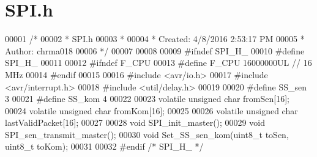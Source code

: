 \hypertarget{styr_2styr_2_s_p_i_8h_source}{}\section{S\+P\+I.\+h}
\label{styr_2styr_2_s_p_i_8h_source}

\begin{DoxyCode}
00001 \textcolor{comment}{/*}
00002 \textcolor{comment}{ * SPI.h}
00003 \textcolor{comment}{ *}
00004 \textcolor{comment}{ * Created: 4/8/2016 2:53:17 PM}
00005 \textcolor{comment}{ *  Author: chrma018}
00006 \textcolor{comment}{ */} 
00007 
00008 
00009 \textcolor{preprocessor}{#ifndef SPI\_H\_}
00010 \textcolor{preprocessor}{#define SPI\_H\_}
00011 
00012 \textcolor{preprocessor}{#ifndef F\_CPU}
00013 \textcolor{preprocessor}{#define F\_CPU 16000000UL        // 16 MHz}
00014 \textcolor{preprocessor}{#endif}
00015 
00016 \textcolor{preprocessor}{#include <avr/io.h>}
00017 \textcolor{preprocessor}{#include <avr/interrupt.h>}
00018 \textcolor{preprocessor}{#include <util/delay.h>}
00019 
00020 \textcolor{preprocessor}{#define SS\_sen 3}
00021 \textcolor{preprocessor}{#define SS\_kom 4}
00022 
00023 \textcolor{keyword}{volatile} \textcolor{keywordtype}{unsigned} \textcolor{keywordtype}{char} fromSen[16];
00024 \textcolor{keyword}{volatile} \textcolor{keywordtype}{unsigned} \textcolor{keywordtype}{char} fromKom[16];
00025 
00026 \textcolor{keyword}{volatile} \textcolor{keywordtype}{unsigned} \textcolor{keywordtype}{char} lastValidPacket[16];
00027 
00028 \textcolor{keywordtype}{void} SPI\_init\_master();
00029 \textcolor{keywordtype}{void} SPI\_sen\_transmit\_master();
00030 \textcolor{keywordtype}{void} Set\_SS\_sen\_kom(uint8\_t toSen, uint8\_t toKom);
00031 
00032 \textcolor{preprocessor}{#endif }\textcolor{comment}{/* SPI\_H\_ */}\textcolor{preprocessor}{}
\end{DoxyCode}

